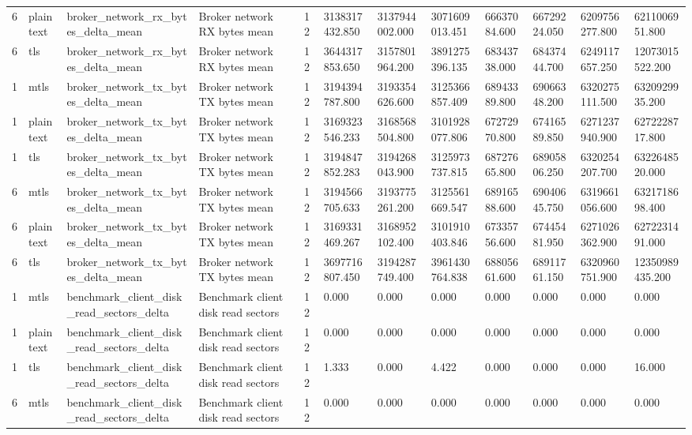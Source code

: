 \begin{longtable}{llllllllllll}
6 & plaintext & broker\_network\_rx\_bytes\_delta\_mean & Broker network RX bytes mean & 12 & 3138317432.850 & 3137944002.000 & 3071609013.451 & 66637084.600 & 66729224.050 & 6209756277.800 & 6211006951.800 \\
6 & tls & broker\_network\_rx\_bytes\_delta\_mean & Broker network RX bytes mean & 12 & 3644317853.650 & 3157801964.200 & 3891275396.135 & 68343738.000 & 68437444.700 & 6249117657.250 & 12073015522.200 \\
1 & mtls & broker\_network\_tx\_bytes\_delta\_mean & Broker network TX bytes mean & 12 & 3194394787.800 & 3193354626.600 & 3125366857.409 & 68943389.800 & 69066348.200 & 6320275111.500 & 6320929935.200 \\
1 & plaintext & broker\_network\_tx\_bytes\_delta\_mean & Broker network TX bytes mean & 12 & 3169323546.233 & 3168568504.800 & 3101928077.806 & 67272970.800 & 67416589.850 & 6271237940.900 & 6272228717.800 \\
1 & tls & broker\_network\_tx\_bytes\_delta\_mean & Broker network TX bytes mean & 12 & 3194847852.283 & 3194268043.900 & 3125973737.815 & 68727665.800 & 68905806.250 & 6320254207.700 & 6322648520.000 \\
6 & mtls & broker\_network\_tx\_bytes\_delta\_mean & Broker network TX bytes mean & 12 & 3194566705.633 & 3193775261.200 & 3125561669.547 & 68916588.600 & 69040645.750 & 6319661056.600 & 6321718698.400 \\
6 & plaintext & broker\_network\_tx\_bytes\_delta\_mean & Broker network TX bytes mean & 12 & 3169331469.267 & 3168952102.400 & 3101910403.846 & 67335756.600 & 67445481.950 & 6271026362.900 & 6272231491.000 \\
6 & tls & broker\_network\_tx\_bytes\_delta\_mean & Broker network TX bytes mean & 12 & 3697716807.450 & 3194287749.400 & 3961430764.838 & 68805661.600 & 68911761.150 & 6320960751.900 & 12350989435.200 \\
1 & mtls & benchmark\_client\_disk\_read\_sectors\_delta & Benchmark client disk read sectors & 12 & 0.000 & 0.000 & 0.000 & 0.000 & 0.000 & 0.000 & 0.000 \\
1 & plaintext & benchmark\_client\_disk\_read\_sectors\_delta & Benchmark client disk read sectors & 12 & 0.000 & 0.000 & 0.000 & 0.000 & 0.000 & 0.000 & 0.000 \\
1 & tls & benchmark\_client\_disk\_read\_sectors\_delta & Benchmark client disk read sectors & 12 & 1.333 & 0.000 & 4.422 & 0.000 & 0.000 & 0.000 & 16.000 \\
6 & mtls & benchmark\_client\_disk\_read\_sectors\_delta & Benchmark client disk read sectors & 12 & 0.000 & 0.000 & 0.000 & 0.000 & 0.000 & 0.000 & 0.000 \\

\end{longtable}
